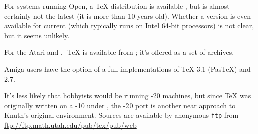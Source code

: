 For  systems running Open, a \TeX{} distribution
is available , but is almost certainly not the latest (it
is more than 10 years old).  Whether a version is even available for
current  (which typically runs on Intel 64-bit processors)
is not clear, but it seems unlikely.

For the Atari  and , -\TeX{} is available
from ; it's offered as a set of  archives.

Amiga users have the option of a full implementations of \TeX{} 3.1
(Pas\TeX{}) and \MF{} 2.7.

It's less likely that hobbyists would be running -20
machines, but since \TeX{} was originally written on a -10
under , the -20 port is another near approach
to Knuth's original environment. Sources are available by anonymous
\texttt{ftp} from \url{ftp://ftp.math.utah.edu/pub/tex/pub/web}
\begin{ctanrefs}
\item[\nothtml{\rmfamily}Atari TeX]
\item[djgpp]
\item[emtex]
\item[emtexTDS]
\item[OpenVMS]
\item[PasTeX]
\end{ctanrefs}


